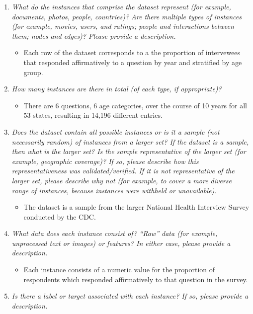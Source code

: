 \documentclass[
]{article}
\providecommand{\tightlist}{%
  \setlength{\itemsep}{0pt}\setlength{\parskip}{0pt}}
\begin{document}
\begin{enumerate}
\def\labelenumi{\arabic{enumi}.}
\tightlist
\item
  \emph{What do the instances that comprise the dataset represent (for example, documents, photos, people, countries)? Are there multiple types of instances (for example, movies, users, and ratings; people and interactions between them; nodes and edges)? Please provide a description.}

  \begin{itemize}
  \tightlist
  \item
    Each row of the dataset corresponds to a the proportion of intervewees that responded affirmatively to a question by year and stratified by age group.
  \end{itemize}
\item
  \emph{How many instances are there in total (of each type, if appropriate)?}

  \begin{itemize}
  \tightlist
  \item
    There are 6 questions, 6 age categories, over the course of 10 years for all 53 states, resulting in 14,196 different entries.
  \end{itemize}
\item
  \emph{Does the dataset contain all possible instances or is it a sample (not necessarily random) of instances from a larger set? If the dataset is a sample, then what is the larger set? Is the sample representative of the larger set (for example, geographic coverage)? If so, please describe how this representativeness was validated/verified. If it is not representative of the larger set, please describe why not (for example, to cover a more diverse range of instances, because instances were withheld or unavailable).}

  \begin{itemize}
  \tightlist
  \item
    The dataset is a sample from the larger National Health Interview Survey conducted by the CDC.
  \end{itemize}
\item
  \emph{What data does each instance consist of? ``Raw'' data (for example, unprocessed text or images) or features? In either case, please provide a description.}

  \begin{itemize}
  \tightlist
  \item
    Each instance consists of a numeric value for the proportion of respondents which responded affirmatively to that question in the survey.
  \end{itemize}
\item
  \emph{Is there a label or target associated with each instance? If so, please provide a description.}


\end{enumerate}
\end{document}
